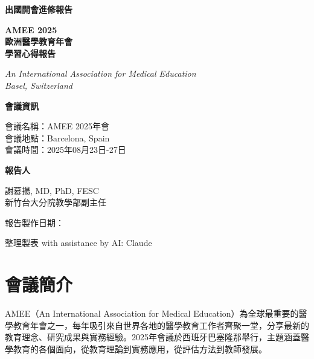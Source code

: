 \documentclass[12pt,a4paper]{article}
\newcommand{\mydate}{\DTMtoday}
\begin{document}
\begin{titlepage}
    \centering
    {\LARGE\textcolor{emergency_red}{\textbf{出國開會進修報告}}\par}
    \vspace{1cm}
    {\huge\bfseries AMEE 2025\\歐洲醫學教育年會\\學習心得報告\par}
    \vspace{0.5cm}
    {\Large\textcolor{emergency_blue}{\textit{An International Association for Medical Education\\Basel, Switzerland}}\par}
    \vspace{1.5cm}
    
    \begin{tcolorbox}[
        colback=emergency_blue!5!white,
        colframe=emergency_blue,
        width=0.8\textwidth,
        arc=10pt,
        boxrule=1pt
    ]
    \centering
    {\large\textbf{會議資訊}\par}
    \vspace{0.3cm}
    會議名稱：AMEE 2025年會\\
    會議地點：Barcelona, Spain\\
    會議時間：2025年08月23日-27日\\
    \vspace{0.5cm}
    {\large\textbf{報告人}\par}
    \vspace{0.3cm}
    謝慕揚, MD, PhD, FESC\\
    新竹台大分院教學部副主任\par
    \end{tcolorbox}

    \vfill
    
    {\large 報告製作日期：\mydate\par}
    {\small 整理製表 with assistance by AI: Claude\par}
    
    \vspace{0.5cm}
\end{titlepage}

\newpage
\tableofcontents
\newpage

\section{會議簡介}

AMEE（An International Association for Medical Education）為全球最重要的醫學教育年會之一，每年吸引來自世界各地的醫學教育工作者齊聚一堂，分享最新的教育理念、研究成果與實務經驗。2025年會議於西班牙巴塞隆那舉行，主題涵蓋醫學教育的各個面向，從教育理論到實務應用，從評估方法到教師發展。
\end{document}

